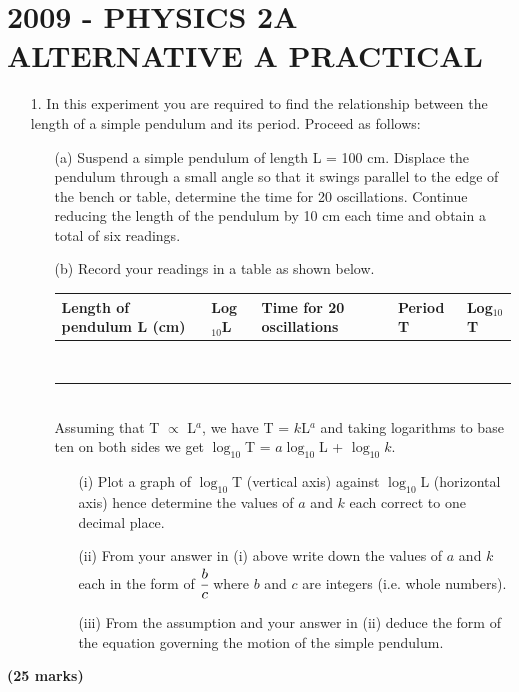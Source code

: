 \section{2009 - PHYSICS 2A ALTERNATIVE A PRACTICAL}

\begin{enumerate}
\item[1.] In this experiment you are required to find the relationship between the length of a simple pendulum and its period. Proceed as follows:
\begin{itemize}
\item[(a)] Suspend a simple pendulum of length L = 100 cm. Displace the pendulum through a small angle so that it swings parallel to the edge of the bench or table, determine the time for 20 oscillations. Continue reducing the length of the pendulum by 10 cm each time and obtain a total of six readings.
\item[(b)] Record your readings in a table as shown below.


\begin{tabular}{|p{2.5cm}|p{2.5cm}|p{2.5cm}|p{2.5cm}|p{2.5cm}|} \hline
Length of pendulum L (cm) & Log$_{10}$L & Time for 20 oscillations & Period T & Log$_{10}$T \\ \hline
&&&& \\ 
&&&& \\ 
&&&& \\ 
&&&& \\ 
&&&& \\ 
&&&& \\ 
&&&& \\ 
&&&& \\ \hline
\end{tabular}\\[10pt]

\noindent Assuming that T $ \propto $ L$^a$, we have T = $k$L$^a$ and taking logarithms to base ten on both sides we get $\log_{10}$T = $a\log_{10}$L + $\log_{10}k$.

\begin{itemize}
\item[(i)] Plot a graph of $\log_{10}$T (vertical axis) against $\log_{10}$L (horizontal axis) hence determine the values of $a$ and $k$ each correct to one decimal place.
\item[(ii)] From your answer in (i) above write down the values of $a$ and $k$ each in the form of $\cfrac{b}{c}$ where $b$ and $c$ are integers (i.e. whole numbers).
\item[(iii)] From the assumption and your answer in (ii) deduce the form of the equation governing the motion of the simple pendulum.
\end{itemize}

\end{itemize}
\end{enumerate}
\flushright \textbf{(25 marks)}



